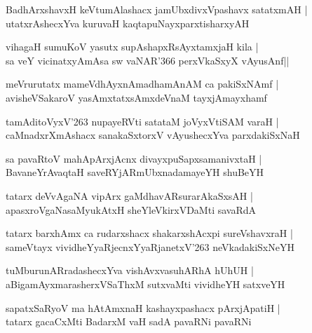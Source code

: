 \documentclass[twoside,12pt,openright]{book}
\newcounter{shloka}[chapter]
\begin{document}
\begin{shloka}
BadhArxshavxH keVtumAlashacx jamUbxdivxVpashavx satatxmAH |\\
utatxrAshecxYva kuruvaH kaqtapuNayxparxtisharxyAH
\end{shloka}

\begin{shloka}
vihagaH sumuKoV yasutx supAshapxRsAyxtamxjaH kila |\\
sa veY vicinatxyAmAsa sw vaNAR\char'366 perxVkaSxyX vAyusAnf||
\end{shloka}

\begin{shloka}
meVrurutatx mameVdhAyxnAmadhamAnAM ca pakiSxNAmf |\\
avisheVSakaroV yasAmxtatxsAmxdeVnaM tayxjAmayxhamf
\end{shloka}

\begin{shloka}
tamAditoVyxV\char'263 nupayeRVti satataM joVyxVtiSAM varaH |\\
caMnadxrXmAshacx sanakaSxtorxV vAyushecxYva parxdakiSxNaH
\end{shloka}

\begin{shloka}
sa pavaRtoV mahApArxjAcnx divayxpuSapxsamanivxtaH |\\
BavaneYrAvaqtaH saveRYjARmUbxnadamayeYH shuBeYH
\end{shloka}

\begin{shloka}
tatarx deVvAgaNA vipArx gaMdhavARsurarAkaSxsAH |\\
apasxroVgaNasaMyukAtxH sheYleVkirxVDaMti savaRdA
\end{shloka}

\begin{shloka}
tatarx barxhAmx ca rudarxshacx shakarxshAcxpi sureVshavxraH |\\
sameVtayx vividheYyaRjecnxYyaRjanetxV\char'263 neVkadakiSxNeYH
\end{shloka}

\begin{shloka}
tuMburunARradashecxYva vishAvxvasuhARhA hUhUH |\\
aBigamAyxmarasherxVSaThxM sutxvaMti vividheYH satxveYH
\end{shloka}

\begin{shloka}
sapatxSaRyoV ma hAtAmxnaH kashayxpashacx pArxjApatiH |\\
tatarx gacaCxMti BadarxM vaH sadA pavaRNi pavaRNi
\end{shloka}
\end{document}
